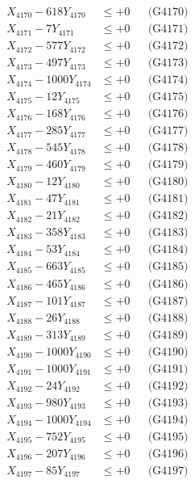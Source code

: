 \documentclass[a4paper,10pt]{article}
\begin{document}
{\begin{align}
X_{4170} - 618Y_{4170} &\leq +0 && \text{(G4170)} \\
\allowbreak
X_{4171} - 7Y_{4171} &\leq +0 && \text{(G4171)} \\
X_{4172} - 577Y_{4172} &\leq +0 && \text{(G4172)} \\
X_{4173} - 497Y_{4173} &\leq +0 && \text{(G4173)} \\
X_{4174} - 1000Y_{4174} &\leq +0 && \text{(G4174)} \\
X_{4175} - 12Y_{4175} &\leq +0 && \text{(G4175)} \\
X_{4176} - 168Y_{4176} &\leq +0 && \text{(G4176)} \\
X_{4177} - 285Y_{4177} &\leq +0 && \text{(G4177)} \\
X_{4178} - 545Y_{4178} &\leq +0 && \text{(G4178)} \\
X_{4179} - 460Y_{4179} &\leq +0 && \text{(G4179)} \\
X_{4180} - 12Y_{4180} &\leq +0 && \text{(G4180)} \\
\allowbreak
X_{4181} - 47Y_{4181} &\leq +0 && \text{(G4181)} \\
X_{4182} - 21Y_{4182} &\leq +0 && \text{(G4182)} \\
X_{4183} - 358Y_{4183} &\leq +0 && \text{(G4183)} \\
X_{4184} - 53Y_{4184} &\leq +0 && \text{(G4184)} \\
X_{4185} - 663Y_{4185} &\leq +0 && \text{(G4185)} \\
X_{4186} - 465Y_{4186} &\leq +0 && \text{(G4186)} \\
X_{4187} - 101Y_{4187} &\leq +0 && \text{(G4187)} \\
X_{4188} - 26Y_{4188} &\leq +0 && \text{(G4188)} \\
X_{4189} - 313Y_{4189} &\leq +0 && \text{(G4189)} \\
X_{4190} - 1000Y_{4190} &\leq +0 && \text{(G4190)} \\
\allowbreak
X_{4191} - 1000Y_{4191} &\leq +0 && \text{(G4191)} \\
X_{4192} - 24Y_{4192} &\leq +0 && \text{(G4192)} \\
X_{4193} - 980Y_{4193} &\leq +0 && \text{(G4193)} \\
X_{4194} - 1000Y_{4194} &\leq +0 && \text{(G4194)} \\
X_{4195} - 752Y_{4195} &\leq +0 && \text{(G4195)} \\
X_{4196} - 207Y_{4196} &\leq +0 && \text{(G4196)} \\
X_{4197} - 85Y_{4197} &\leq +0 && \text{(G4197)} \\

\end{align}}
\end{document}
